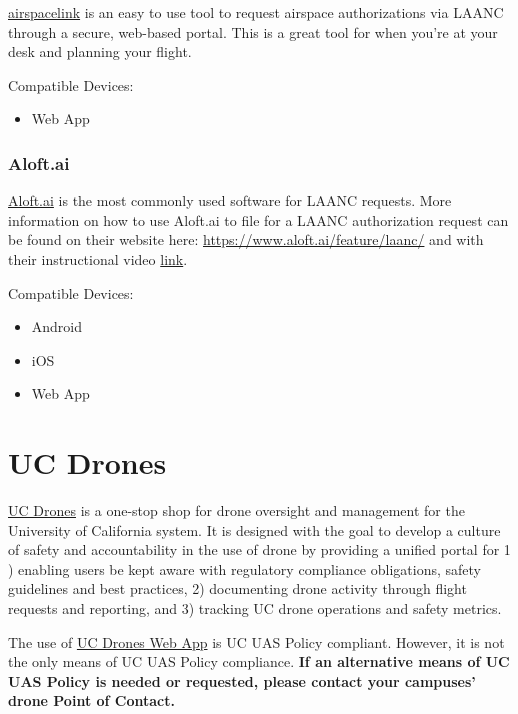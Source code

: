 \documentclass[
  12pt,
]{book}
\providecommand{\tightlist}{%
  \setlength{\itemsep}{0pt}\setlength{\parskip}{0pt}}
\begin{document}
\href{https://airspacelink.com/}{airspacelink} is an easy to use tool to request airspace authorizations via LAANC through a secure, web-based portal. This is a great tool for when you're at your desk and planning your flight.

Compatible Devices:

\begin{itemize}
\tightlist
\item
  Web App
\end{itemize}

\subsection{Aloft.ai}\label{aloft.ai}

\href{https://www.aloft.ai/}{Aloft.ai} is the most commonly used software for LAANC requests. More information on how to use Aloft.ai to file for a LAANC authorization request can be found on their website here: \url{https://www.aloft.ai/feature/laanc/} and with their instructional video \href{https://www.youtube.com/watch?v=kVl7R0XWz2k&ab_channel=Aloft}{link}.

Compatible Devices:

\begin{itemize}
\tightlist
\item
  Android
\item
  iOS
\item
  Web App
\end{itemize}

\chapter{UC Drones}\label{UCdrones}

\href{http://ehs.ucop.edu/drones}{UC Drones} is a one-stop shop for drone oversight and management for the University of California system. It is designed with the goal to develop a culture of safety and accountability in the use of drone by providing a unified portal for 1 ) enabling users be kept aware with regulatory compliance obligations, safety guidelines and best practices, 2) documenting drone activity through flight requests and reporting, and 3) tracking UC drone operations and safety metrics.

The use of \href{http://ehs.ucop.edu/drones}{UC Drones Web App} is UC UAS Policy compliant. However, it is not the only means of UC UAS Policy compliance. \textbf{If an alternative means of UC UAS Policy is needed or requested, please contact your campuses' drone Point of Contact.}
\end{document}
